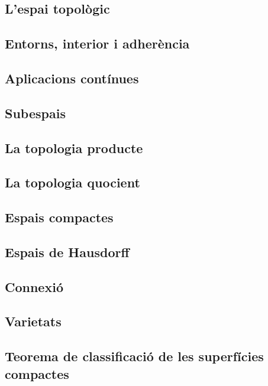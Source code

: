 \documentclass[../Apunts.tex]{subfiles}
\begin{document}
	\subsection{L'espai topològic}
	\subsection{Entorns, interior i adherència}
	\subsection{Aplicacions contínues}
	\subsection{Subespais}
	\subsection{La topologia producte}
	\subsection{La topologia quocient}
	\subsection{Espais compactes}
	\subsection{Espais de Hausdorff}
	\subsection{Connexió}
	\subsection{Varietats}
	\subsection{Teorema de classificació de les superfícies compactes}
\end{document}
